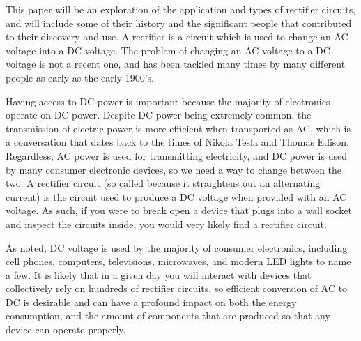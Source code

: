 
This paper will be an exploration of the application
and types of rectifier circuits, and will include some
of their history and the significant people that contributed
to their discovery and use. A rectifier is a circuit
which is used to change an AC voltage into a DC voltage.
The problem of changing an AC voltage to a DC voltage
is not a recent one, and has been tackled many times
by many different people as early as the early 1900's.

Having access to DC power is important because the majority
of electronics operate on DC power. Despite DC power
being extremely common, the transmission of electric
power is more efficient when transported as AC, which
is a conversation that dates back to the times of Nikola
Tesla and Thomas Edison. Regardless, AC power is used
for transmitting electricity, and DC power is used by
many consumer electronic devices, so we need a way to
change between the two. A rectifier circuit (so called
because it straightens out an alternating current) is
the circuit used to produce a DC voltage when provided
with an AC voltage. As such, if you were to break open
a device that plugs into a wall socket and inspect the
circuits inside, you would very likely find a rectifier
circuit.

As noted, DC voltage is used by the majority of consumer
electronics, including cell phones, computers, televisions,
microwaves, and modern LED lights to name a few. It
is likely that in a given day you will interact with
devices that collectively rely on hundreds of rectifier
circuits, so efficient conversion of AC to DC is desirable
and can have a profound impact on both the energy consumption,
and the amount of components that are produced so that
any device can operate properly.
